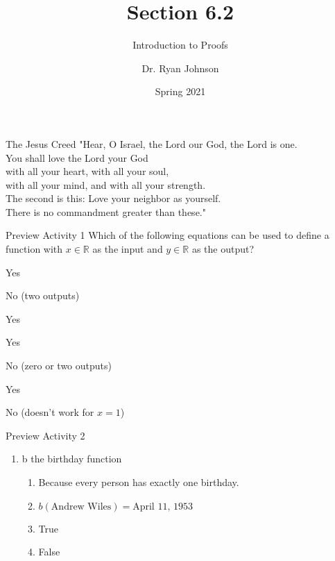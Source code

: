\documentclass{beamer}
\title{Section 6.2}
\subtitle{Introduction to Proofs}
\author{Dr. Ryan Johnson}
\institute{Grace College}
\date{Spring 2021}
\newcounter{saveenumi}
\newcommand{\seti}{\setcounter{saveenumi}{\value{enumi}}}
\begin{document}
\begin{frame}[plain]
    \maketitle
\end{frame}

\begin{frame}{The Jesus Creed}
\Large{
"Hear, O Israel, the Lord our God, the Lord is one.\\
You shall love the Lord your God\\
\;\; with all your heart, with all your soul,\\
\;\; with all your mind, and with all your strength.\\
The second is this: Love your neighbor as yourself.\\
There is no commandment greater than these."
}
\end{frame}

\begin{frame}[t]{Preview Activity 1}
Which of the following equations can be used to define a function with $x \in \mathbb{R}$
as the input and $y \in \mathbb{R}$ as the output?
    \begin{enumerate}
    \begin{multicols}{2}
        \item Yes
        \item No (two outputs)
        \item Yes
        \item Yes
        \item No (zero or two outputs)
        \item Yes
        \item No (doesn't work for $x=1$)
    \end{multicols}
    \end{enumerate}
\end{frame}

\begin{frame}{Preview Activity 2}
    \begin{enumerate}
        \item b the birthday function
        \begin{enumerate}
            \item Because every person has exactly one birthday.
            \item $b(\text{Andrew Wiles}) = \text{April 11, 1953}$
            \item True
            \item False
        \end{enumerate}
        \seti
    \end{enumerate}
\end{frame}
\end{document}
